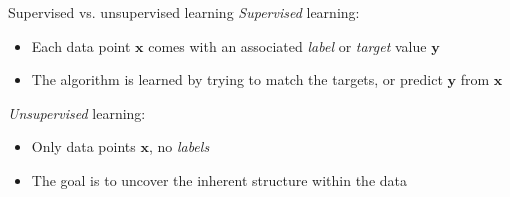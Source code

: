 \documentclass[dvipsnames]{beamer}
\begin{document}
		
		\begin{frame}{Supervised vs. unsupervised learning}
			\emph{Supervised} learning:
			\begin{itemize}
				\item Each data point $\mathbf{x}$ comes with an associated \emph{label} or \emph{target} value $\mathbf{y}$
				\item The algorithm is learned by trying to match the targets, or predict $\mathbf{y}$ from $\mathbf{x}$
			\end{itemize}

			\emph{Unsupervised} learning:
			\begin{itemize}
				\item Only data points $\mathbf{x}$, no \emph{labels}
				\item The goal is to uncover the inherent structure within the data
			\end{itemize}
    \end{frame}
		
\end{document}
